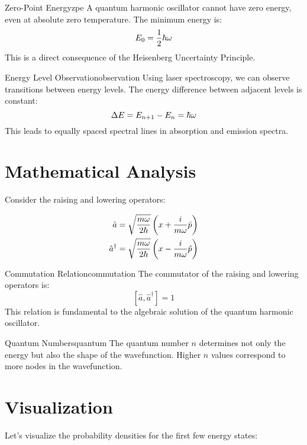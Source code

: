 \documentclass[12pt,a4paper]{article}
\begin{document}
\begin{law}{Zero-Point Energy}{zpe}
A quantum harmonic oscillator cannot have zero energy, even at absolute zero temperature. The minimum energy is:
\[ E_0 = \frac{1}{2}\hbar\omega \]
This is a direct consequence of the Heisenberg Uncertainty Principle.
\end{law}

\begin{experiment}{Energy Level Observation}{observation}
Using laser spectroscopy, we can observe transitions between energy levels. The energy difference between adjacent levels is constant:
\[ \Delta E = E_{n+1} - E_n = \hbar\omega \]
This leads to equally spaced spectral lines in absorption and emission spectra.
\end{experiment}

\section{Mathematical Analysis}

Consider the raising and lowering operators:

\begin{align}
    \hat{a} &= \sqrt{\frac{m\omega}{2\hbar}}\left(x + \frac{i}{m\omega}\hat{p}\right) \\
    \hat{a}^\dagger &= \sqrt{\frac{m\omega}{2\hbar}}\left(x - \frac{i}{m\omega}\hat{p}\right)
\end{align}

\begin{lemma}{Commutation Relation}{commutation}
The commutator of the raising and lowering operators is:
\[ [\hat{a}, \hat{a}^\dagger] = 1 \]
This relation is fundamental to the algebraic solution of the quantum harmonic oscillator.
\end{lemma}

\begin{note}{Quantum Numbers}{quantum}
The quantum number $n$ determines not only the energy but also the shape of the wavefunction. Higher $n$ values correspond to more nodes in the wavefunction.
\end{note}

\section{Visualization}

Let's visualize the probability densities for the first few energy states:

\begin{center}
\end{center}
\end{document}
